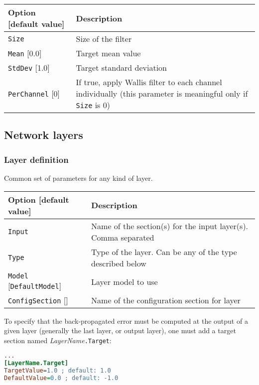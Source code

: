 \documentclass[a4paper,11pt,oneside]{article}
\begin{document}
\begin{center}
 \begin{tabular}{| p{5cm} | p{10cm} | }
 \hline
 Option [default value] & Description\\
 \hline\hline
  \cellcolor{requiredcolor}\lstinline!Size! & Size of the filter \\
  \lstinline!Mean! [0.0] & Target mean value \\
  \lstinline!StdDev! [1.0] & Target standard deviation \\
  \lstinline!PerChannel! [0] & If true, apply Wallis filter to each channel
  individually (this parameter is meaningful only if \lstinline!Size! is 0) \\
 \hline
\end{tabular}
\end{center}

\subsection{Network layers}

\subsubsection{Layer definition}
Common set of parameters for any kind of layer.

\begin{center}
 \begin{tabular}{| p{5cm} | p{10cm} | }
 \hline
 Option [default value] & Description\\
 \hline\hline
  \cellcolor{requiredcolor}\lstinline!Input! & Name of the section(s) for the
  input layer(s). Comma separated \\
  \cellcolor{requiredcolor}\lstinline!Type! & Type of the layer. Can be any of
  the type described below \\
  \lstinline!Model! [\lstinline!DefaultModel!] & Layer model to use \\
  \lstinline!ConfigSection! [] & Name of the configuration section for layer \\
 \hline
\end{tabular}
\end{center}

To specify that the back-propagated error must be computed at the output of a
given layer (generally the last layer, or output layer), one must add a target
section named \emph{LayerName}\lstinline!.Target!:
\begin{lstlisting}[language=ini]
...
[LayerName.Target]
TargetValue=1.0 ; default: 1.0
DefaultValue=0.0 ; default: -1.0
\end{lstlisting}
\end{document}
